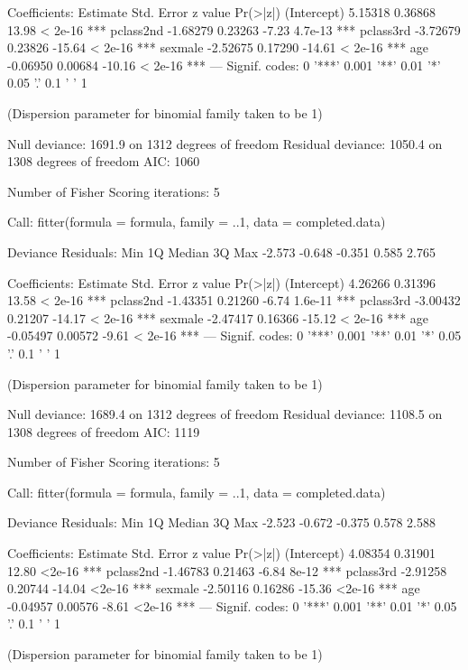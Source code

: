 \begin{Schunk}
\begin{Soutput}
Coefficients:
            Estimate Std. Error z value Pr(>|z|)    
(Intercept)  5.15318    0.36868   13.98  < 2e-16 ***
pclass2nd   -1.68279    0.23263   -7.23  4.7e-13 ***
pclass3rd   -3.72679    0.23826  -15.64  < 2e-16 ***
sexmale     -2.52675    0.17290  -14.61  < 2e-16 ***
age         -0.06950    0.00684  -10.16  < 2e-16 ***
---
Signif. codes:  0 '***' 0.001 '**' 0.01 '*' 0.05 '.' 0.1 ' ' 1

(Dispersion parameter for binomial family taken to be 1)

    Null deviance: 1691.9  on 1312  degrees of freedom
Residual deviance: 1050.4  on 1308  degrees of freedom
AIC: 1060

Number of Fisher Scoring iterations: 5


Call:
fitter(formula = formula, family = ..1, data = completed.data)

Deviance Residuals: 
   Min      1Q  Median      3Q     Max  
-2.573  -0.648  -0.351   0.585   2.765  

Coefficients:
            Estimate Std. Error z value Pr(>|z|)    
(Intercept)  4.26266    0.31396   13.58  < 2e-16 ***
pclass2nd   -1.43351    0.21260   -6.74  1.6e-11 ***
pclass3rd   -3.00432    0.21207  -14.17  < 2e-16 ***
sexmale     -2.47417    0.16366  -15.12  < 2e-16 ***
age         -0.05497    0.00572   -9.61  < 2e-16 ***
---
Signif. codes:  0 '***' 0.001 '**' 0.01 '*' 0.05 '.' 0.1 ' ' 1

(Dispersion parameter for binomial family taken to be 1)

    Null deviance: 1689.4  on 1312  degrees of freedom
Residual deviance: 1108.5  on 1308  degrees of freedom
AIC: 1119

Number of Fisher Scoring iterations: 5


Call:
fitter(formula = formula, family = ..1, data = completed.data)

Deviance Residuals: 
   Min      1Q  Median      3Q     Max  
-2.523  -0.672  -0.375   0.578   2.588  

Coefficients:
            Estimate Std. Error z value Pr(>|z|)    
(Intercept)  4.08354    0.31901   12.80   <2e-16 ***
pclass2nd   -1.46783    0.21463   -6.84    8e-12 ***
pclass3rd   -2.91258    0.20744  -14.04   <2e-16 ***
sexmale     -2.50116    0.16286  -15.36   <2e-16 ***
age         -0.04957    0.00576   -8.61   <2e-16 ***
---
Signif. codes:  0 '***' 0.001 '**' 0.01 '*' 0.05 '.' 0.1 ' ' 1

(Dispersion parameter for binomial family taken to be 1)


\end{Soutput}
\end{Schunk}
